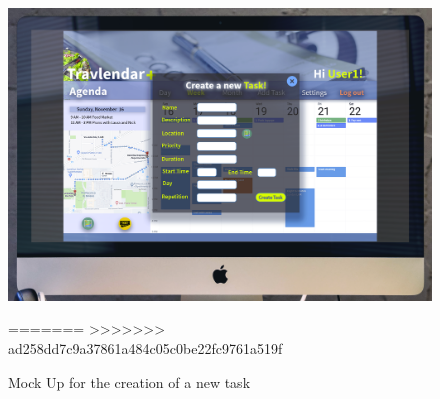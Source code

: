 \begin{figure}[H]
    \centering
    \includegraphics[scale=0.2]{Pictures/UXDiagram/desktopMockUpAddTask.png}
    \caption{Mock Up for the creation of a new task}
    \label{fig:addTaskMockUp}
=======
    \label{fig:my_label}
>>>>>>> ad258dd7c9a37861a484c05c0be22fc9761a519f
\end{figure}